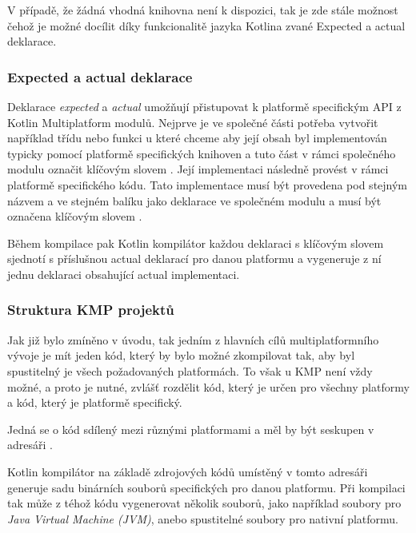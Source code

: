 V případě, že žádná vhodná knihovna není k dispozici, tak je zde stále možnost čehož je možné docílit díky funkcionalitě jazyka Kotlina
zvané Expected a actual deklarace.

\subsubsection*{Expected a actual deklarace}\label{expectActual}
Deklarace \textit{expected} a \textit{actual} umožňují přistupovat k platformě specifickým API z Kotlin Multiplatform modulů. \cite{KMPExpectActual}
Nejprve je ve společné části potřeba vytvořit například třídu nebo funkci u které chceme aby její obsah byl implementován typicky pomocí
platformě specifických knihoven a tuto část v rámci společného modulu označit klíčovým slovem . \cite{KMPExpectActual} Její implementaci následně provést v rámci
platformě specifického kódu. Tato implementace musí být provedena pod stejným názvem a ve stejném balíku jako deklarace ve společném modulu
a musí být označena klíčovým slovem . \cite{KMPExpectActual}

Během kompilace pak Kotlin kompilátor každou deklaraci s klíčovým slovem  sjednotí s příslušnou actual deklarací pro danou platformu
a vygeneruje z ní jednu deklaraci obsahující actual implementaci. \cite{KMPExpectActual}

\subsubsection*{Struktura KMP projektů}\label{projectStructure}
Jak již bylo zmíněno v úvodu, tak jedním z hlavních cílů multiplatformního vývoje je mít 
jeden kód, který by bylo možné zkompilovat tak, aby byl spustitelný je všech požadovaných platformách. To však u KMP není vždy 
možné, a proto je nutné, zvlášť rozdělit kód, který je určen pro všechny platformy a kód, který je platformě specifický. 

Jedná se o kód sdílený mezi různými platformami a měl by být seskupen v adresáři . \cite{KMPCommonCode}

Kotlin kompilátor na základě zdrojových kódů umístěný v tomto adresáři generuje sadu binárních souborů specifických pro danou platformu. \cite{KMPCommonCode}
Při kompilaci tak může z téhož kódu vygenerovat několik souborů, jako například soubory pro \textit{Java Virtual Machine (JVM)}, 
anebo spustitelné soubory pro nativní platformu. \cite{KMPCommonCode}


